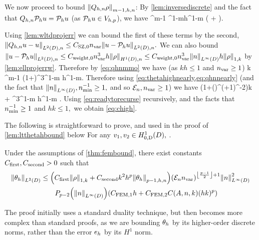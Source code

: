 We now proceed to bound $\Nfn{m-1,h,n}{\Qhn \rho}$: By \cref{lem:inversediscrete} and the fact that $Q_{h,n} \mathcal P_{h} u = \mathcal P_{h} u$ (as $\mathcal P_{h} u \in V_{h,p}$), we have
\beq\label{eq:qhnmmo}
 \leq \Chinv^{m-1} \nmin^{1-m}h^{1-m} \mleft( + \mright).
\eeq

Using \cref{lem:wltdprojerr} we can bound the first of these terms by the second, $\NLtDn{\Qhn u - u} \leq \CSZfn{0} \nvar \NLtDn{u-\Ph u}.$ We can also bound $\NLtDn{u - \Ph u} \leq \Cwfn{0} \nvar^3h \NHnfn{1}{D}{\rho} \leq \Cwfn{0} \nvar^3\NLiD{n} h \NW{\rho}$ by \cref{lem:ellprojerrw}. Therefore by \cref{eq:qhnmmo} we have (as $kh \leq 1$ and $n_{\mathrm{var}} \geq 1$)
\beq\label{eq:qhnnearly}
k  \leq \Chinv^{m-1} \mleft(1+\mright)\nvar^3\nmin^{1-m} h^{1-m}\NW{\rho}.
\eeq
Therefore using \cref{eq:thetahighnearly,eq:qhnnearly} (and the fact that $\NLiD{n}, \nmin^{-1} \geq 1,$ and so $\mathcal E_{n}, n_{\mathrm{var}} \geq1$)  we have
\beq\label{eq:readytorecurse}
 \leq {} \mleft(1+\mleft(\En\nvar\mright)^{\half(+1)}\nmin^{-2}\mright)k  + \CRect \nvar^3\nmin^{1-m} h^{1-m} \NW{\rho}.
\eeq
Using \cref{eq:readytorecurse} recursively, and the facts that $n_{\min}^{-1} \geq 1$ and $hk \leq 1,$ we obtain \cref{eq:chigh}.
\epf

The following  is straightforward to prove, and used in the proof of \cref{lem:ltthetahbound} below
\ble[Continuity of $a$]\label{lem:continuity}
For any $\vo, \vt \in \HozDD,$
\beqs
{} \leq \Cc {} \NW{\vo}\NW{\vt}.
\eeqs
\ele

\label{lem:ltthetahbound}
Under the assumptions of \cref{thm:fembound}, there exist constants $C_{\mathrm{first}}, C_{\mathrm{second}} > 0$ such that
\begin{align}
\NLtD{\thetah}&\leq \mleft(\Cfirst\NW{\rho} +\Csecond  k^2h^p\Nfn{p-1,h,n}{\thetah}\mright)\mleft(\En \nvar\mright)^{\floor{\frac{p-1}2}+1}\NLiD{n}^2\nonumber\\
&\quad\quad\Pfn{p-2}\mleft(\NLiD{n}\mright)\mleft(\CFEMotilde h + \CFEMttilde \CAnk (hk)^p\mright)\label{eq:ltthetahbound}
\end{align}
\ele

The proof initially uses a standard duality technique, but then becomes more complex than standard proofs, as we are bounding $\theta_{h}$ by its higher-order discrete norms, rather than the error $e_{h}$ by its $H^1$ norm.

